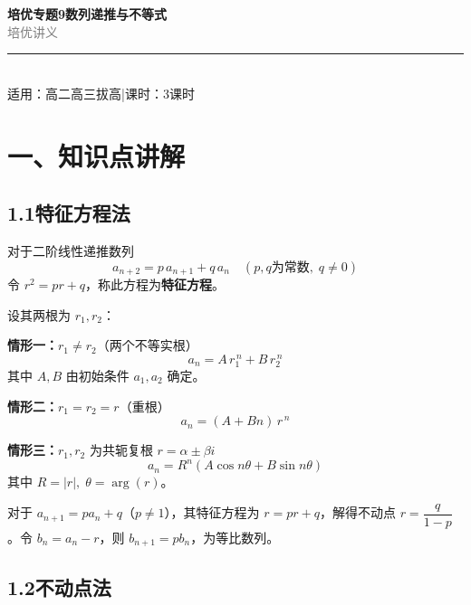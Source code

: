 \documentclass[12pt, a4paper]{ctexart}
\begin{document}
\begin{center}
{\Huge\bfseries\textcolor{mainblue}{培优专题9\quad 数列递推与不等式}}\\[12pt]
{\Large\textcolor{gray}{培\quad 优\quad 讲\quad 义}}\\[8pt]
\rule{0.6\textwidth}{1pt}\\[8pt]
{\normalsize 适用：高二高三拔高\quad |\quad 课时：3课时}
\end{center}
\vspace{10pt}

\section*{\textcolor{mainblue}{一、知识点讲解}}

\subsection*{1.1\quad 特征方程法}

\begin{knowledgebox}[特征方程法基本原理]
对于二阶线性递推数列
\[
a_{n+2} = p\,a_{n+1} + q\,a_n \quad (p,q\text{为常数},\;q\neq 0)
\]
令 $r^2 = pr + q$，称此方程为\textbf{特征方程}。

设其两根为 $r_1, r_2$：

\textbf{情形一：}$r_1 \neq r_2$（两个不等实根）
\[
a_n = A\,r_1^{\,n} + B\,r_2^{\,n}
\]
其中 $A, B$ 由初始条件 $a_1, a_2$ 确定。

\textbf{情形二：}$r_1 = r_2 = r$（重根）
\[
a_n = (A + Bn)\,r^{\,n}
\]

\textbf{情形三：}$r_1, r_2$ 为共轭复根 $r = \alpha \pm \beta i$
\[
a_n = R^n\left(A\cos n\theta + B\sin n\theta\right)
\]
其中 $R = |r|,\;\theta = \arg(r)$。
\end{knowledgebox}

\begin{tipbox}[推广：一阶线性递推]
对于 $a_{n+1} = pa_n + q$（$p\neq 1$），其特征方程为 $r = pr + q$，解得不动点 $r = \dfrac{q}{1-p}$。令 $b_n = a_n - r$，则 $b_{n+1} = pb_n$，为等比数列。
\end{tipbox}

\subsection*{1.2\quad 不动点法}
\end{document}
